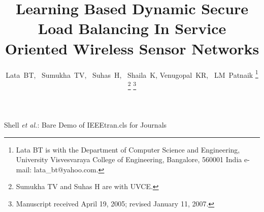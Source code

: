 \documentclass[journal]{IEEEtran}
\begin{document}
%
\title{Learning Based Dynamic Secure Load Balancing In Service Oriented Wireless Sensor Networks}
%
%
%

\author{Lata~BT,~\IEEEmembership{}
        Sumukha~TV,~
        Suhas~H,~
	 Shaila~K,
	 Venugopal~KR,~
       LM~Patnaik%
\thanks{Lata BT is with the Department
of Computer Science and Engineering, University Visvesvaraya College of Engineering,
Bangalore, 560001 India e-mail: lata\_bt@yahoo.com.}%
\thanks{Sumukha TV and Suhas H are with UVCE.}%
\thanks{Manuscript received April 19, 2005; revised January 11, 2007.}}

% 
%



%
{Shell \MakeLowercase{\textit{et al.}}: Bare Demo of IEEEtran.cls for Journals}
% 
\end{document}
